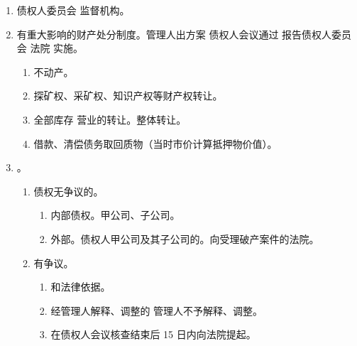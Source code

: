 \begin{enumerate}
\begin{enumerate}
          \item 特殊事项。重整、和解。1/2 + 2/3。
        \end{enumerate}
  \item 债权人委员会 \ydy 监督机构。
  \item 有重大影响的财产处分制度。管理人出方案 \yjt 债权人会议通过 \yjt 报告债权人委员会 \hz 法院 \yjt 实施。
        \begin{enumerate}
          \item 不动产。
          \item 探矿权、采矿权、知识产权等财产权转让。
          \item 全部库存 \hz 营业的转让。整体转让。
          \item 借款、清偿债务取回质物（当时市价计算抵押物价值）。
        \end{enumerate}
  \item {}。
        \begin{enumerate}
          \item 债权无争议的。
                \begin{enumerate}
                  \item 内部债权。甲公司、子公司。
                  \item 外部。债权人甲公司及其子公司的。向受理破产案件的法院。
                \end{enumerate}
          \item 有争议。
                \begin{enumerate}
                  \item {}和法律依据。
                  \item 经管理人解释、调整的 \hz 管理人不予解释、调整。
                  \item 在债权人会议核查结束后 15 日内向法院提起。
                \end{enumerate}
        \end{enumerate}
\end{enumerate}
